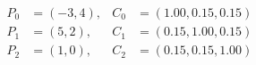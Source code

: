 \documentclass[border=6pt]{standalone}
\begin{document}
\color{black}
\(\displaystyle
\begin{aligned}
P_0 &= (-3,4), & C_0 &= (1.00, 0.15, 0.15) \\
P_1 &= (5,2),  & C_1 &= (0.15, 1.00, 0.15) \\
P_2 &= (1,0),  & C_2 &= (0.15, 0.15, 1.00)
\end{aligned}
\)
\end{document}
